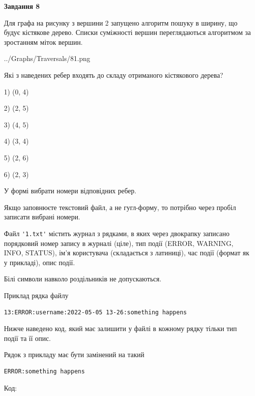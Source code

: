 \documentclass[12pt, ukrainian]{article}
\def\code#1{\Verb!#1!}
\begin{document}
{\begin {large}
{\begin {center}\textbf{Завдання 8}\end {center}}\par
Для графа на рисунку з вершини 2 запущено алгоритм пошуку в ширину, що будує кістякове дерево. Списки суміжності вершин переглядаються алгоритмом за зростанням міток вершин.\par
\begin{center}
	{../Graphs/Traversals/81.png}
\end{center}
\par Які з наведених ребер входять до складу отриманого кістякового дерева?\par
1) (0, 4)\par
2) (2, 5)\par
3) (4, 5)\par
4) (3, 4)\par
5) (2, 6)\par
6) (2, 3)\par
{\vskip 15pt} У формі вибрати номери відповідних ребер.


Якщо заповнюєте текстовий файл, а не гугл-форму, то потрібно через пробіл записа\-ти вибрані номери.\par
\newpage


Файл \code{'1.txt'} містить журнал з рядками, в яких через двокрапку записано поряд\-ко\-вий номер запису в журналі (ціле), тип події (ERROR, WARNING, INFO, STATUS), ім'я користувача (складається з латиниці), час події (фор\-мат як у прикладі), опис події.

Білі символи навколо роздільників не допускаються.

Приклад рядка файлу



\begin{verbatim}
13:ERROR:username:2022-05-05 13-26:something happens
\end{verbatim}


Нижче наведено код, який має залишити у файлі в кожному рядку тільки тип події та її опис.

Рядок з прикладу має бути замінений на такий



\begin{verbatim}
ERROR:something happens
\end{verbatim}




Код:




\end{large}}
\end{document}
